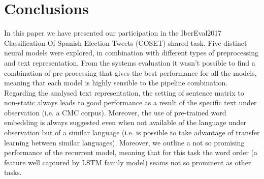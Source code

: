 \section{Conclusions} \label{sec:conclusion}

In this paper we have presented our participation in the IberEval2017 Classification Of Spanish Election Tweets (COSET) shared task. Five distinct neural models were explored, in combination with different types of preprocessing and text representation.
From the systems evaluation it wasn't possible to find a combination of pre-processing that gives the best performance for all the models, meaning that each model is highly sensible to the pipeline combination.
Regarding the analysed text representation, the setting of sentence matrix to non-static always leads to good performance as a result of the specific text under observation (i.e. a CMC corpus). Moreover, the use of pre-trained word embedding is always suggested even when not available of the language under observation but of a similar language (i.e. is possible to take advantage of transfer learning between similar languages).
Moreover, we outline a not so promising performance of the recurrent model, meaning that for this task the word order (a feature well captured by LSTM family model) seams not so prominent as other tasks.